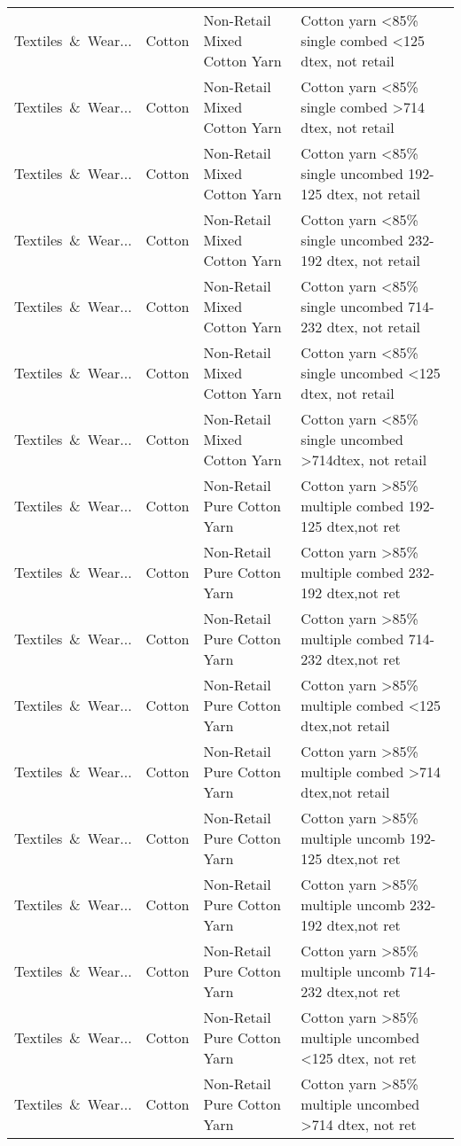 \begin{appendices}
\begin{xltabular}{\textwidth}{|p{0.10\textwidth}|p{0.25\textwidth}|p{0.24\textwidth}|p{0.31\textwidth}|}
Textiles\ \&\ Wear... & Cotton & Non-Retail Mixed Cotton Yarn & Cotton yarn <85\% single combed <125 dtex, not retail \\
Textiles\ \&\ Wear... & Cotton & Non-Retail Mixed Cotton Yarn & Cotton yarn <85\% single combed >714 dtex, not retail \\
Textiles\ \&\ Wear... & Cotton & Non-Retail Mixed Cotton Yarn & Cotton yarn <85\% single uncombed 192-125 dtex, not retail \\
Textiles\ \&\ Wear... & Cotton & Non-Retail Mixed Cotton Yarn & Cotton yarn <85\% single uncombed 232-192 dtex, not retail \\
Textiles\ \&\ Wear... & Cotton & Non-Retail Mixed Cotton Yarn & Cotton yarn <85\% single uncombed 714-232 dtex, not retail \\
Textiles\ \&\ Wear... & Cotton & Non-Retail Mixed Cotton Yarn & Cotton yarn <85\% single uncombed <125 dtex, not retail \\
Textiles\ \&\ Wear... & Cotton & Non-Retail Mixed Cotton Yarn & Cotton yarn <85\% single uncombed >714dtex, not retail \\
Textiles\ \&\ Wear... & Cotton & Non-Retail Pure Cotton Yarn & Cotton yarn >85\% multiple combed 192-125 dtex,not ret \\
Textiles\ \&\ Wear... & Cotton & Non-Retail Pure Cotton Yarn & Cotton yarn >85\% multiple combed 232-192 dtex,not ret \\
Textiles\ \&\ Wear... & Cotton & Non-Retail Pure Cotton Yarn & Cotton yarn >85\% multiple combed 714-232 dtex,not ret \\
Textiles\ \&\ Wear... & Cotton & Non-Retail Pure Cotton Yarn & Cotton yarn >85\% multiple combed <125 dtex,not retail \\
Textiles\ \&\ Wear... & Cotton & Non-Retail Pure Cotton Yarn & Cotton yarn >85\% multiple combed >714 dtex,not retail \\
Textiles\ \&\ Wear... & Cotton & Non-Retail Pure Cotton Yarn & Cotton yarn >85\% multiple uncomb 192-125 dtex,not ret \\
Textiles\ \&\ Wear... & Cotton & Non-Retail Pure Cotton Yarn & Cotton yarn >85\% multiple uncomb 232-192 dtex,not ret \\
Textiles\ \&\ Wear... & Cotton & Non-Retail Pure Cotton Yarn & Cotton yarn >85\% multiple uncomb 714-232 dtex,not ret \\
Textiles\ \&\ Wear... & Cotton & Non-Retail Pure Cotton Yarn & Cotton yarn >85\% multiple uncombed <125 dtex, not ret \\
Textiles\ \&\ Wear... & Cotton & Non-Retail Pure Cotton Yarn & Cotton yarn >85\% multiple uncombed >714 dtex, not ret \\

\end{xltabular}
\end{appendices}
